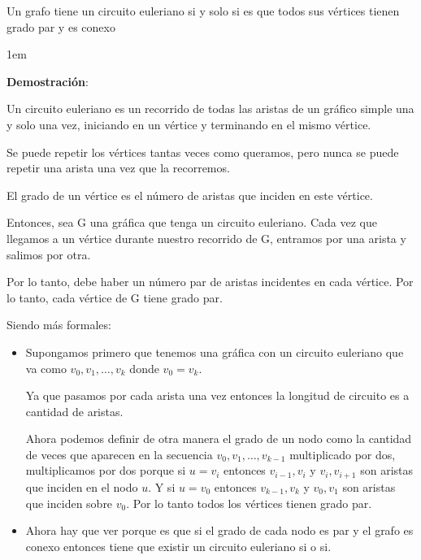 \documentclass[12pt, fleqn]{article}                            %
\newenvironment{SmallIndentation}[1][0.75em]                    %
        {\begin{adjustwidth}{#1}{}\begin{footnotesize}}             %
        {\end{footnotesize}\end{adjustwidth}}                       %
\theoremstyle{break}                                            %
\begin{document}
    Un grafo tiene un circuito euleriano si y solo si es que todos sus vértices tienen grado par y es conexo

    \begin{SmallIndentation}[1em]
        \textbf{Demostración}:
    
        Un circuito euleriano es un recorrido de todas las aristas de un gráfico simple
        una y solo una vez, iniciando en un vértice y terminando en el mismo vértice.
        
        Se puede repetir los vértices tantas veces como queramos, pero nunca se puede repetir
        una arista una vez que la recorremos.

        El grado de un vértice es el número de aristas que inciden en este vértice.

        Entonces, sea G una gráfica que tenga un circuito euleriano. 
        Cada vez que llegamos a un vértice durante nuestro recorrido de G, 
        entramos por una arista y salimos por otra.
        
        Por lo tanto, debe haber un número par de aristas incidentes en cada vértice.
        Por lo tanto, cada vértice de G tiene grado par.

        Siendo más formales:
        \begin{itemize}
            \item Supongamos primero que tenemos una gráfica con un circuito euleriano
                que va como $v_0, v_1, \dots, v_k$ donde $v_0 = v_k$.

                Ya que pasamos por cada arista una vez entonces la longitud de circuito
                es a cantidad de aristas.

                Ahora podemos definir de otra manera el grado de un nodo como la cantidad
                de veces que aparecen en la secuencia $v_0, v_1, \dots, v_{k-1}$ multiplicado
                por dos, multiplicamos por dos porque si $u = v_i$ entonces $v_{i-1}, v_i$
                y $v_{i}, v_{i+1}$ son aristas que inciden en el nodo $u$. 
                Y si $u = v_0$ entonces $v_{k-1}, v_k$ y $v_{0}, v_{1}$ son aristas que inciden
                sobre $v_0$. Por lo tanto todos los vértices tienen grado par.

            \item
                Ahora hay que ver porque es que si el grado de cada nodo es par y el grafo es conexo entonces
                tiene que existir un circuito euleriano si o si.


\end{itemize}
\end{SmallIndentation}
\end{document}
